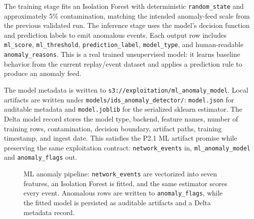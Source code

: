 \documentclass[11pt,a4paper]{article}
\newcommand{\code}[1]{\nolinkurl{#1}}
\begin{document}
The training stage fits an Isolation Forest with deterministic \code{random_state} and approximately 5\% contamination, matching the intended anomaly-feed scale from the previous validated run. The inference stage uses the model's decision function and prediction labels to emit anomalous events. Each output row includes \code{ml_score}, \code{ml_threshold}, \code{prediction_label}, \code{model_type}, and human-readable \code{anomaly_reasons}. This is a real trained unsupervised model: it learns baseline behavior from the current replay/event dataset and applies a prediction rule to produce an anomaly feed.

The model metadata is written to \code{s3://exploitation/ml_anomaly_model}. Local artifacts are written under \code{models/ids_anomaly_detector/}: \code{model.json} for auditable metadata and \code{model.joblib} for the serialized sklearn estimator. The Delta model record stores the model type, backend, feature names, number of training rows, contamination, decision boundary, artifact paths, training timestamp, and ingest date. This satisfies the P2.1 ML artifact promise while preserving the same exploitation contract: \code{network_events} in, \code{ml_anomaly_model} and \code{anomaly_flags} out.

\begin{figure}[H]
  \centering
  \caption{ML anomaly pipeline: \code{network_events} are vectorized into seven features, an Isolation Forest is fitted, and the same estimator scores every event. Anomalous rows are written to \code{anomaly_flags}, while the fitted model is persisted as auditable artifacts and a Delta metadata record.}
\end{figure}
\end{document}
